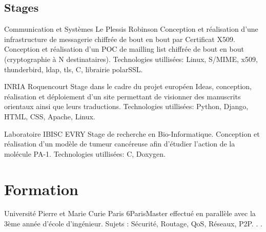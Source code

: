 \documentclass[10pt,a4paper]{moderncv}
\begin{document}
\subsection{Stages}

              {Communication et Systèmes}
              {Le Plessis Robinson}
              {}
              {Conception et réalisation d'une infrastructure de messagerie chiffrée de bout en bout par
               Certificat X509. Conception et réalisation d'un POC de mailling list chiffrée de bout en bout
               (cryptographie à N destinataires).
               \newline Technologies utillisées: Linux, S/MIME, x509, thunderbird, ldap, tls, C, librairie polarSSL.
              }

              {INRIA}
              {Roquencourt}
              {}
              {Stage dans le cadre du projet européen Ideas, 
                 conception, réalisation et déploiement d'un site permettant de visionner 
                 des manuscrits orientaux ainsi que leurs traductions.
                 \newline Technologies utillisées: Python, Django, HTML, CSS, Apache, Linux.
              }

              {Laboratoire IBISC}
              {EVRY}
              {}
              {Stage de recherche en Bio-Informatique. Conception
                et réalisation d'un modèle de tumeur
                cancéreuse afin d'étudier l'action de la molécule PA-1.
                \newline Technologies utillisées: C, Doxygen.
              }


\section{Formation}
{Université Pierre et Marie Curie Paris 6}{Paris}{}{Master effectué en parallèle avec la 3ème année d’école d’ingénieur. Sujets : Sécurité, Routage,
QoS, Réseaux, P2P. . .}
\end{document}
